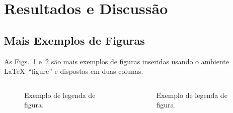 \documentclass[%
  10pt,%
  aspectratio = 43,%
  compress,%
  t,%
  english,%
  brazilian,%
]{beamer}
\begin{document}
\section{Resultados e Discussão}\label{sec:resuldisc}

\subsection{Mais Exemplos de Figuras}\label{ssec:resuldisc1}

\begin{frame}[allowframebreaks]
As Figs.~\ref{fig:graficoxy1} e~\ref{fig:graficoxy2} são mais exemplos de figuras inseridas usando o ambiente \LaTeX\ \enquote{figure} e dispostas em duas colunas.
\begin{columns}[T]
\begin{figure}[!htb]
\centering%
\caption{Exemplo de legenda de figura.}%
\label{fig:graficoxy1}
\end{figure}
\begin{figure}[!htb]
\centering%
\caption{Exemplo de legenda de figura.}%
\label{fig:graficoxy2}

\end{figure}
\end{columns}
\end{frame}
\end{document}
